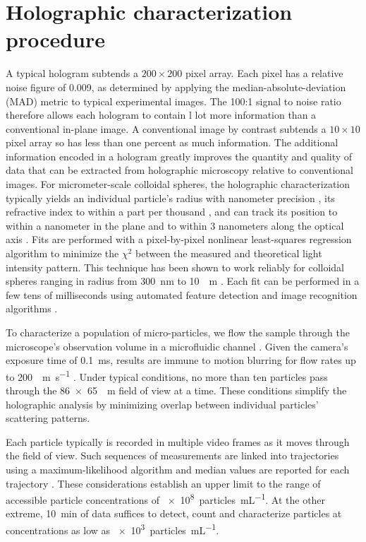 \section{Holographic characterization procedure}
A typical hologram subtends a $200 \times 200$ pixel array.
Each pixel has a relative noise figure of 0.009, as determined
by applying the median-absolute-deviation (MAD) metric to typical experimental images.
The 100:1 signal to noise ratio therefore allows each hologram to contain l lot more information than a conventional in-plane image.
A conventional image by contrast subtends a $10 \times 10$ pixel array so has less than one percent as much information. The additional information encoded in a hologram greatly improves the quantity and quality of data that can be extracted from holographic microscopy relative to conventional images.
For micrometer-scale colloidal spheres, the holographic characterization typically yields an individual particle's radius 
with nanometer precision \cite{cheong09,shpaisman12},
its refractive index to within a part per thousand 
\cite{cheong09,moyses13}, and
can track its position to within a nanometer in the plane
and to within 3 nanometers along the optical axis
\cite{lee07a,cheong09,cheong10a,moyses13,krishnatreya14}. Fits are performed with a pixel-by-pixel nonlinear least-squares regression algorithm to minimize the $\chi^2$ between the measured and theoretical light intensity pattern. This technique has been shown to work reliably for colloidal spheres ranging in radius from \SI{300}{\nm} to \SI{10}{\mu m} \cite{lee07a}.
Each fit can be performed in a few tens of milliseconds
using automated feature detection \cite{krishnatreya14a}
and image recognition algorithms \cite{yevick14}.

To characterize a population of micro-particles, we flow the sample through the microscope's
observation volume in a microfluidic channel \cite{cheong09}.
Given the camera's exposure time of \SI{0.1}{\ms}, results
are immune to motion blurring for flow rates up to
\SI{200}{\mu m\per\second} \cite{cheong09,dixon11}.
Under typical conditions, no more than ten particles pass through the \SI{86 x 65}{\mu m} field of view at a time.
These conditions simplify the holographic analysis by minimizing overlap
between individual particles' scattering patterns.

Each particle typically is recorded in multiple video frames
as it moves through the field of view.
Such sequences of measurements are linked into trajectories
using a maximum-likelihood algorithm \cite{crocker96}
and median values are reported for each trajectory \cite{cheong09}.
These considerations establish an upper limit to the range
of accessible particle concentrations of \SI{e8}{particles\per\mL}.
At the other extreme, \SI{10}{\minute} of data suffices to
detect, count and characterize particles at concentrations as
low as \SI{e3}{particles\per\mL}.

